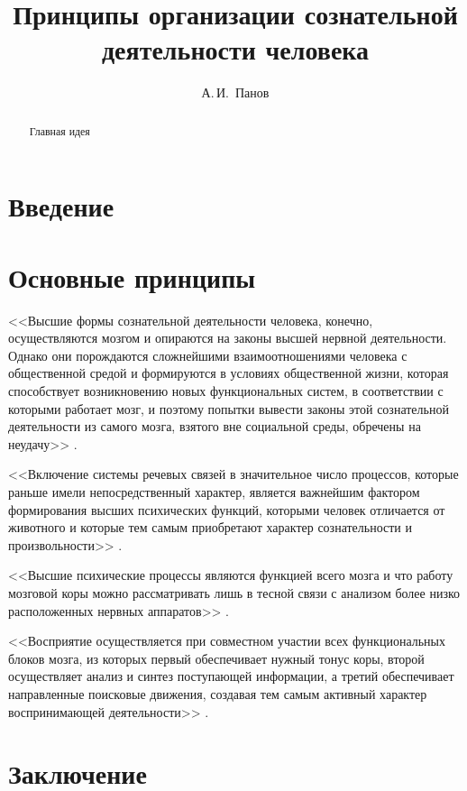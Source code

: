 \documentclass[a4paper,12pt]{article}
\begin{document}
	\title{Принципы организации сознательной деятельности человека}
	\author{А.\,И.~Панов}
	
	\maketitle{}
	
	\begin{abstract}
		Главная идея
	\end{abstract}
	
	\section*{Введение}

	\section{Основные принципы}
	
	<<Высшие формы сознательной деятельности человека, конечно, осуществляются мозгом и опираются на законы высшей нервной деятельности. Однако они порождаются сложнейшими взаимоотношениями человека с общественной средой и формируются в условиях общественной жизни, которая способствует возникновению новых функциональных систем, в соответствии с которыми работает мозг, и поэтому попытки вывести законы этой сознательной деятельности из самого мозга, взятого вне социальной среды, обречены на неудачу>> \cite{Luria1977}.
	
	<<Включение системы речевых связей в значительное число процессов, которые раньше имели непосредственный характер, является важнейшим фактором формирования высших психических функций, которыми человек отличается от животного и которые тем самым приобретают характер сознательности и произвольности>> \cite{Luria2000}.
	
	<<Высшие психические процессы являются функцией всего мозга и что работу мозговой коры можно рассматривать лишь в тесной связи с анализом более низко расположенных нервных аппаратов>> \cite{Luria2000}.
	
	<<Восприятие осуществляется при совместном участии всех функциональных блоков мозга, из которых первый обеспечивает нужный тонус коры, второй осуществляет анализ и синтез поступающей информации, а третий обеспечивает направленные поисковые движения, создавая тем самым активный характер воспринимающей деятельности>> \cite{Luria2003}.
	\section*{Заключение}
	
   \printbibliography
\end{document}
